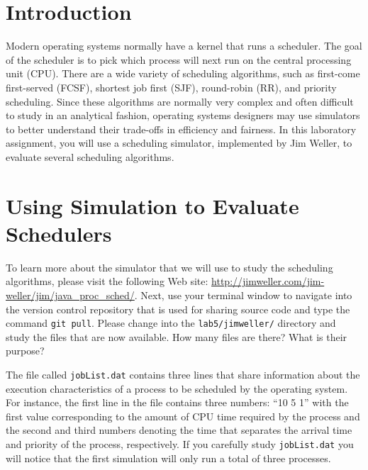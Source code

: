 


\usepackage[compact]{titlesec}


\section*{Introduction}

  Modern operating systems normally have a kernel that runs a scheduler.  The goal of the scheduler is to pick which
  process will next run on the central processing unit (CPU).  There are a wide variety of scheduling algorithms, such
  as first-come first-served (FCSF), shortest job first (SJF), round-robin (RR), and priority scheduling.  Since these
  algorithms are normally very complex and often difficult to study in an analytical fashion, operating systems
  designers may use simulators to better understand their trade-offs in efficiency and fairness. In this laboratory
  assignment, you will use a scheduling simulator, implemented by Jim Weller, to evaluate several scheduling algorithms.

\section*{Using Simulation to Evaluate Schedulers}

  To learn more about the simulator that we will use to study the scheduling algorithms, please visit the following Web
  site: \url{http://jimweller.com/jim-weller/jim/java_proc_sched/}. Next, use your terminal window to navigate into the
  version control repository that is used for sharing source code and type the command {\tt git pull}.  Please change
  into the {\tt lab5/jimweller/} directory and study the files that are now available. How many files are there? What is
  their purpose?

  The file called {\tt jobList.dat} contains three lines that share information about the execution characteristics of a
  process to be scheduled by the operating system.  For instance, the first line in the file contains three numbers: ``10
  5 1'' with the first value corresponding to the amount of CPU time required by the process and the second and third
  numbers denoting the time that separates the arrival time and priority of the process, respectively. If you carefully
  study {\tt jobList.dat} you will notice that the first simulation will only run a total of three processes.

